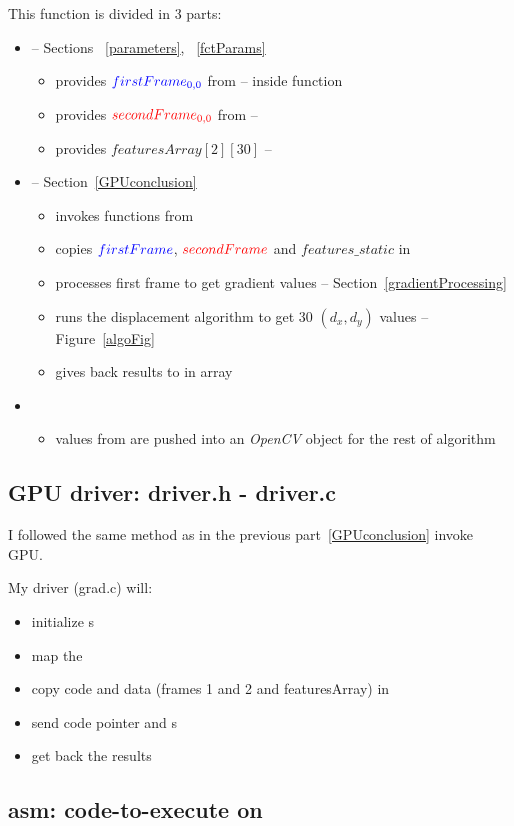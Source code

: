 This function is divided in 3 parts:
\begin{itemize}
	\item {} -- Sections ~\ref{parameters}, ~\ref{fctParams}
		\begin{itemize}
			\item provides $\textcolor{blue}{firstFrame_{0,0}}$ from  --  inside function
			\item provides $\textcolor{red}{secondFrame_{0,0}}$  from  -- 
			\item provides  $featuresArray[2][30]$ -- 
		\end{itemize}
	\item {} -- Section~\ref{GPUconclusion}
		\begin{itemize}
			\item invokes functions from 
			\item copies $\textcolor{blue}{firstFrame}$, $\textcolor{red}{secondFrame}$ and $features\_static$ in \ram
			\item processes first frame to get gradient values -- Section~\ref{gradientProcessing}
			\item runs the displacement algorithm to get 30 $(d_{x}, d_{y})$ values -- Figure~\ref{algoFig}
			\item gives back results to \cpu in   array
		\end{itemize}
	\item {}
		\begin{itemize}
			\item values from  are pushed into an \emph{OpenCV} object for the rest of  algorithm
		\end{itemize}
\end{itemize}

\subsection{GPU driver: driver.h - driver.c}
I followed the same method as in the previous part~\ref{GPUconclusion} invoke GPU.

My driver (grad.c) will:
\begin{itemize}
	\item initialize \qpu{}s
	\item map the \ram
	\item copy code and data (frames 1 and 2 and featuresArray) in \ram
	\item send code pointer and \uni{}s
	\item get back the results
\end{itemize}

\subsection{asm: code-to-execute on \vc}
